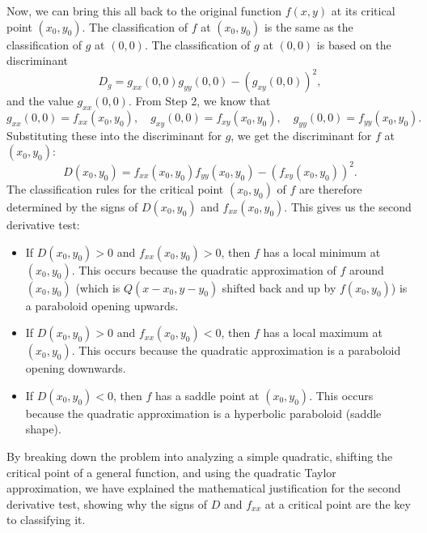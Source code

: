 \documentclass{article}
\begin{document}
Now, we can bring this all back to the original function \( f(x,y) \) at its critical point \( (x_0, y_0) \). The classification of \( f \) at \( (x_0, y_0) \) is the same as the classification of \( g \) at \( (0,0) \). The classification of \( g \) at \( (0,0) \) is based on the discriminant 
\[
	D_g = g_{xx}(0,0)g_{yy}(0,0) - (g_{xy}(0,0))^2,
\]
and the value \( g_{xx}(0,0) \). From Step 2, we know that 
\[
	g_{xx}(0,0) = f_{xx}(x_0, y_0), \quad g_{xy}(0,0) = f_{xy}(x_0, y_0), \quad g_{yy}(0,0) = f_{yy}(x_0, y_0).
\]
Substituting these into the discriminant for \( g \), we get the discriminant for \( f \) at \( (x_0, y_0) \):
\[
	D(x_0, y_0) = f_{xx}(x_0, y_0)f_{yy}(x_0, y_0) - (f_{xy}(x_0, y_0))^2.
\]
The classification rules for the critical point \( (x_0, y_0) \) of \( f \) are therefore determined by the signs of \( D(x_0, y_0) \) and \( f_{xx}(x_0, y_0) \). This gives us the second derivative test:

\begin{itemize}
	\item If \( D(x_0, y_0) > 0 \) and \( f_{xx}(x_0, y_0) > 0 \), then \( f \) has a local minimum at \( (x_0, y_0) \). This occurs because the quadratic approximation of \( f \) around \( (x_0, y_0) \) (which is \( Q(x-x_0, y-y_0) \) shifted back and up by \( f(x_0, y_0) \)) is a paraboloid opening upwards.
	\item If \( D(x_0, y_0) > 0 \) and \( f_{xx}(x_0, y_0) < 0 \), then \( f \) has a local maximum at \( (x_0, y_0) \). This occurs because the quadratic approximation is a paraboloid opening downwards.
	\item If \( D(x_0, y_0) < 0 \), then \( f \) has a saddle point at \( (x_0, y_0) \). This occurs because the quadratic approximation is a hyperbolic paraboloid (saddle shape).
\end{itemize}
By breaking down the problem into analyzing a simple quadratic, shifting the critical point of a general function, and using the quadratic Taylor approximation, we have explained the mathematical justification for the second derivative test, showing why the signs of \( D \) and \( f_{xx} \) at a critical point are the key to classifying it.
\end{document}
